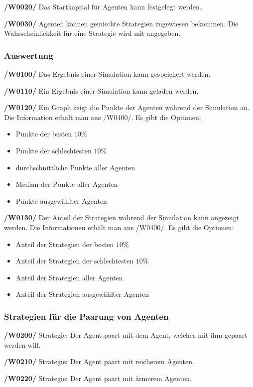 \textbf{/W0020/}
Das Startkapital für Agenten kann festgelegt werden.

\textbf{/W0030/}
Agenten können gemischte Strategien zugewiesen bekommen. Die Wahrscheinlichkeit für eine Strategie wird mit angegeben.

\subsubsection{Auswertung}

\textbf{/W0100/}
Das Ergebnis einer Simulation kann gespeichert werden.

\textbf{/W0110/}
Ein Ergebnis einer Simulation kann geladen werden.

\textbf{/W0120/}
Ein Graph zeigt die Punkte der Agenten während der Simulation an. Die Information erhält man aus /W0400/. Es gibt die Optionen:
\begin{itemize}
\item Punkte der besten $10\%$
\item Punkte der schlechtesten $10\%$
\item durchschnittliche Punkte aller Agenten
\item Median der Punkte aller Agenten
\item Punkte ausgewählter Agenten
\end{itemize}

\textbf{/W0130/}
Der Anteil der Strategien während der Simulation kann angezeigt werden. Die Informationen erhält man aus /W0400/. Es gibt die Optionen:
\begin{itemize}
\item Anteil der Strategien der besten $10\%$
\item Anteil der Strategien der schlechtesten $10\%$
\item Anteil der Strategien aller Agenten
\item Anteil der Strategien ausgewählter Agenten
\end{itemize}

\subsubsection{Strategien für die Paarung von Agenten}

\textbf{/W0200/}
Strategie: Der Agent paart mit dem Agent, welcher mit ihm gepaart werden will.

\textbf{/W0210/} 
Strategie: Der Agent paart mit reicherem Agenten.

\textbf{/W0220/}
Strategie: Der Agent paart mit ärmerem Agenten.

